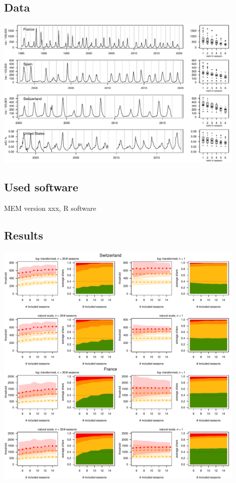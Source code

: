 \documentclass{article}
\begin{document}
\subsection{Data}

\includegraphics[width=0.9\textwidth]{figure/plot_data.pdf}

\subsection{Used software}

MEM version xxx, R software

\subsection{Results}

\includegraphics[page=1, width=0.9\textwidth]{figure/plot_results.pdf}
\end{document}
